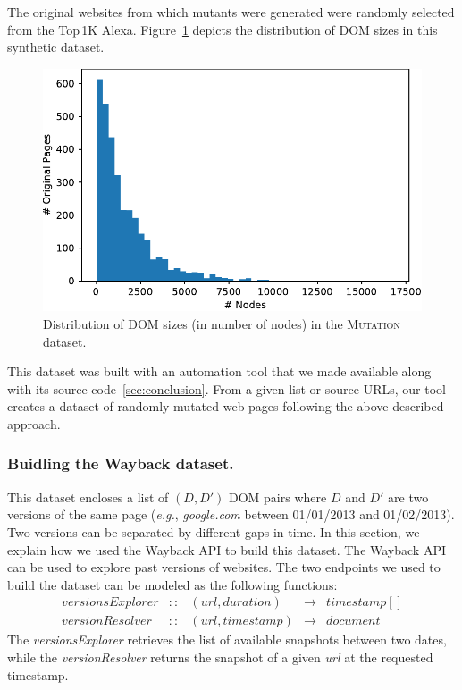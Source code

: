 The original websites from which mutants were generated were randomly selected from the Top\,1K Alexa.
Figure~\ref{fig:distribution} depicts the distribution of DOM sizes in this synthetic dataset. 

\begin{figure}[h]
  \centering
  \includegraphics[width=.8\linewidth]{erratum/distribution}
  \caption{Distribution of DOM sizes (in number of nodes) in the \textsc{Mutation} dataset.}
  \label{fig:distribution}
\end{figure}

This dataset was built with an automation tool that we made available along with its source code~\ref{sec:conclusion}.
From a given list or source URLs, our tool creates a dataset of randomly mutated web pages following the above-described approach.

\subsubsection{Buidling the {\sc Wayback} dataset.}\label{waybackDataset}
This dataset encloses a list of $(D, D')$ DOM pairs where $D$ and $D'$ are two versions of the same page (\emph{e.g.}, \textit{google.com} between 01/01/2013 and 01/02/2013).
Two versions can be separated by different gaps in time.
In this section, we explain how we used the Wayback API to build this dataset.
The Wayback API can be used to explore past versions of websites.
The two endpoints we used to build the dataset can be modeled as the following functions:
\begin{align*}
versionsExplorer &::& (url, duration)  & \to & timestamp[] \\
versionResolver  &::& (url, timestamp) & \to & document
\end{align*}
The \textit{versionsExplorer} retrieves the list of available snapshots between two dates, while the \textit{versionResolver} returns the snapshot of a given \textit{url} at the requested timestamp.

